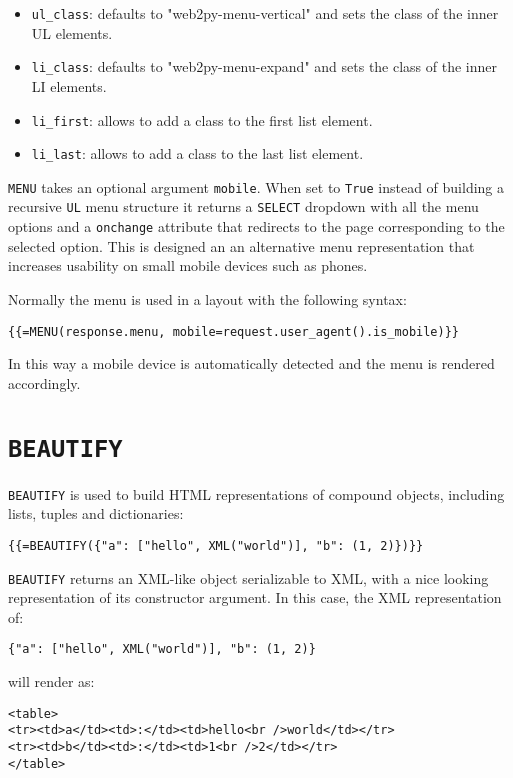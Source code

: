 \documentclass[justified,sixbynine,notoc]{tufte-book}
\def\ft{\small\tt}
\def\inxx#1{\index{#1}}
\begin{document}
\begin{fullwidth}
\begin{itemize}
\item {\ft ul\_class}: defaults to "web2py-menu-vertical" and sets the class of the inner UL elements.

\item {\ft li\_class}: defaults to "web2py-menu-expand" and sets the class of the inner LI elements.

\item {\ft li\_first}: allows to add a class to the first list element.

\item {\ft li\_last}: allows to add a class to the last list element.
\end{itemize}

\inxx{mobile}

{\ft MENU} takes an optional argument {\ft mobile}. When set to {\ft True} instead of building a recursive {\ft UL} menu structure it returns a {\ft SELECT} dropdown with all the menu options and a {\ft onchange} attribute that redirects to the page corresponding to the selected option. This is designed an an alternative menu representation that increases usability on small mobile devices such as phones.

Normally the menu is used in a layout with the following syntax:

\begin{lstlisting}[keywords={}]
{{=MENU(response.menu, mobile=request.user_agent().is_mobile)}}
\end{lstlisting}

In this way a mobile device is automatically detected and the menu is rendered accordingly.

\goodbreak\section{{\ft BEAUTIFY}}

{\ft BEAUTIFY} is used to build HTML representations of compound objects, including lists, tuples and dictionaries:
\begin{lstlisting}[keywords={}]
{{=BEAUTIFY({"a": ["hello", XML("world")], "b": (1, 2)})}}
\end{lstlisting}
{\ft BEAUTIFY} returns an XML-like object serializable to XML, with a nice looking representation of its constructor argument. In this case, the XML representation of:
\begin{lstlisting}
{"a": ["hello", XML("world")], "b": (1, 2)}
\end{lstlisting}
\noindent will render as:
\begin{lstlisting}[keywords={}]
<table>
<tr><td>a</td><td>:</td><td>hello<br />world</td></tr>
<tr><td>b</td><td>:</td><td>1<br />2</td></tr>
</table>
\end{lstlisting}


\end{fullwidth}
\end{document}
